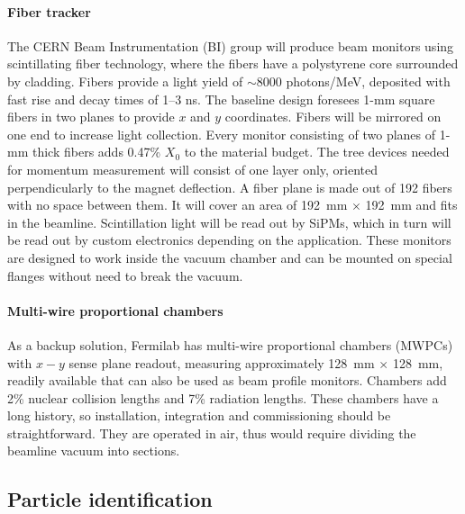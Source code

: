 \paragraph{Fiber tracker}
The CERN Beam Instrumentation (BI) group will produce
 beam monitors %
 using scintillating fiber technology, where %
 the fibers have a polystyrene core surrounded by cladding\cite{Scifi}. Fibers provide a light yield of $\sim$8000 photons/MeV, deposited with fast rise and decay times of 1--3 ns. The baseline design foresees 1-mm square fibers in two planes to provide $x$ and $y$ coordinates. Fibers will be mirrored on one end to increase
light collection.  Every monitor consisting of two planes of 1-mm thick fibers adds 0.47\% $X_0$ to the material budget. 
 The tree  devices needed for momentum measurement will consist of one layer only, oriented perpendicularly to the magnet deflection.
A fiber plane is made out of 192 fibers with no space between them. It will cover an area of 192~mm $\times$ 192~mm and fits in the beamline.
Scintillation light will be read out by SiPMs, which in turn will be read out by custom electronics depending on the application. %
%
These monitors are designed to work inside the vacuum chamber and can be mounted on special flanges without need to break the vacuum.

\paragraph{Multi-wire proportional chambers}
As a backup solution,
Fermilab has multi-wire proportional chambers (MWPCs) with $x-y$ sense plane
readout, measuring approximately 128~mm $\times$ 128~mm, readily available that can also be used as beam profile monitors.  
Chambers add 2\% nuclear collision lengths and 7\% radiation lengths.
 These chambers have a long history, so installation, integration and commissioning should be straightforward. They are operated in air, thus would require dividing the beamline vacuum into sections.


\subsection{Particle identification}

